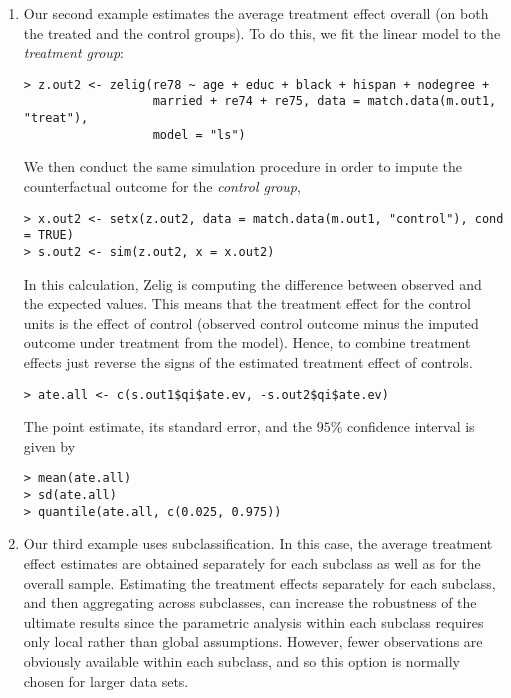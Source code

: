 \begin{enumerate}
\item Our second example estimates the average treatment effect
  overall (on both the treated and the control groups).  To do this,
  we fit the linear model to the {\it treatment group}:
\begin{verbatim}
> z.out2 <- zelig(re78 ~ age + educ + black + hispan + nodegree + 
                  married + re74 + re75, data = match.data(m.out1, "treat"), 
                  model = "ls")
\end{verbatim}
We then conduct the same simulation procedure in order to impute the
counterfactual outcome for the {\it control group},
\begin{verbatim}
> x.out2 <- setx(z.out2, data = match.data(m.out1, "control"), cond = TRUE)
> s.out2 <- sim(z.out2, x = x.out2)
\end{verbatim}
In this calculation, Zelig is computing the difference between
observed and the expected values.  This means that the treatment
effect for the control units is the effect of control (observed
control outcome minus the imputed outcome under treatment from the
model).  Hence, to combine treatment effects just reverse the signs of
the estimated treatment effect of controls.
\begin{verbatim}
> ate.all <- c(s.out1$qi$ate.ev, -s.out2$qi$ate.ev)
\end{verbatim}
The point estimate, its standard error, and the $95\%$ confidence
interval is given by
\begin{verbatim}
> mean(ate.all)
> sd(ate.all)
> quantile(ate.all, c(0.025, 0.975))
\end{verbatim}
  
\item Our third example uses subclassification. In this case, the
  average treatment effect estimates are obtained separately for each
  subclass as well as for the overall sample.  Estimating the
  treatment effects separately for each subclass, and then aggregating
  across subclasses, can increase the robustness of the ultimate
  results since the parametric analysis within each subclass requires
  only local rather than global assumptions.  However, fewer
  observations are obviously available within each subclass, and so
  this option is normally chosen for larger data sets.


\end{enumerate}
